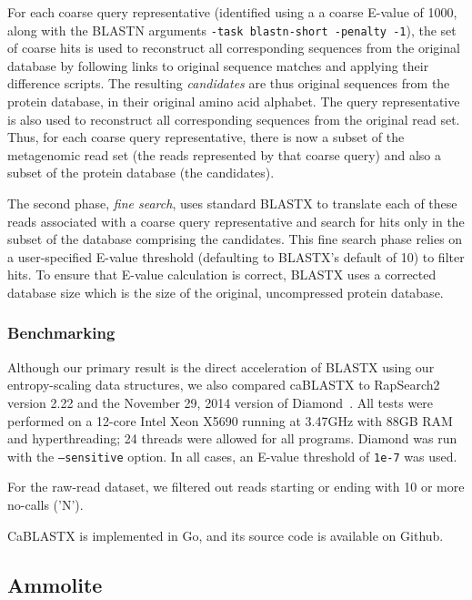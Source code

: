 \documentclass[review,preprint,12pt]{elsarticle}
\renewcommand{\cite}{\citep} %
\theoremstyle{definition}
\theoremstyle{remark}
\begin{document}
For each coarse query representative (identified using a a coarse E-value of 
1000, along with the BLASTN arguments \texttt{-task blastn-short -penalty -1}), 
the set of coarse hits is used to
reconstruct all corresponding sequences from the original database by following
links to original sequence matches and applying their difference scripts.
The resulting \emph{candidates} are thus original sequences from the protein
database, in their original amino acid alphabet.
The query representative is also used to reconstruct all corresponding sequences
from the original read set.
Thus, for each coarse query representative, there is now a subset of the
metagenomic read set (the reads represented by that coarse query) and also a
subset of the protein database (the candidates).

The second phase, \emph{fine search}, uses standard BLASTX to translate each
of these reads associated with a coarse query representative and search for
hits only in the subset of the database comprising the candidates.
This fine search phase relies on a user-specified E-value threshold (defaulting
to BLASTX's default of 10) to filter hits.
To ensure that E-value calculation is correct, BLASTX uses a corrected database
size which is the size of the original, uncompressed protein database.

\subsubsection{Benchmarking}

Although our primary result is the direct acceleration of BLASTX using our
entropy-scaling data structures, we also compared caBLASTX to 
RapSearch2~\cite{zhao2012rapsearch2} version 2.22 and the November 29, 2014 
version of Diamond~\cite{buchfink2014fast}.
All tests were performed on a 12-core Intel Xeon X5690 running at 3.47GHz with
88GB RAM and hyperthreading; 24 threads were allowed for all programs.
Diamond was run with the \texttt{--sensitive} option.
In all cases, an E-value threshold of \texttt{1e-7} was used.

For the raw-read dataset, we filtered out reads starting or ending with 10 or 
more no-calls ('N').

CaBLASTX is implemented in Go, and its source code is available on Github.

\subsection{Ammolite}
\end{document}
